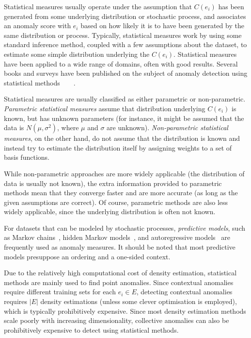 Statistical measures usually operate under the assumption that $C(e_i)$ has been generated from some underlying distribution or stochastic process, and associates an anomaly score with $e_i$ based on how likely it is to have been generated by the same distribution or process. Typically, statistical measures work by using some standard inference method, coupled with a few assumptions about the dataset, to estimate some simple distribution underlying the $C(e_i)$. Statistical measures have been applied to a wide range of domains, often with good results. Several books and surveys have been published on the subject of anomaly detection using statistical methods~\cite{barnett}~\cite{bakar}~\cite{leroy}~\cite{hawkins}.

Statistical measures are usually classified as either parametric or non-parametric. \emph{Parametric statistical measures} assume that distribution underlying $C(e_i)$ is known, but has unknown parameters (for instance, it might be assumed that the data is $N(\mu, \sigma^2)$, where $\mu$ and $\sigma$ are unknown). \emph{Non-parametric statistical measures}, on the other hand, do not assume that the distribution is known and instead try to estimate the distribution itself by assigning weights to a set of basis functions.

While non-parametric approaches are more widely applicable (the distribution of data is usually not known), the extra information provided to parametric methods mean that they converge faster and are more accurate (as long as the given assumptions are correct). Of course, parametric methods are also less widely applicable, since the underlying distribution is often not known.

For datasets that can be modeled by stochastic processes, \emph{predictive models}, such as Markov chains~\cite{TODO}, hidden Markov models~\cite{TODO}, and autoregressive models~\cite{TODO} are frequently used as anomaly measures. It should be noted that most predictive models presuppose an ordering and a one-sided context.

Due to the relatively high computational cost of density estimation, statistical methods are mainly used to find point anomalies. Since contextual anomalies require different training sets for each $e_i \in E$, detecting contextual anomalies requires $|E|$ density estimations (unless some clever optimisation is employed), which is typically prohibitively expensive. Since most density estimation methods scale poorly with increasing dimensionality, collective anomalies can also be prohibitively expensive to detect using statistical methods.


